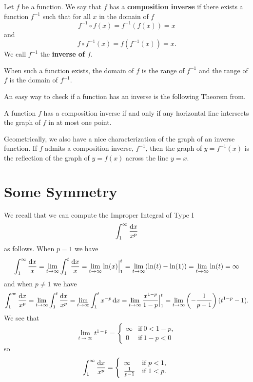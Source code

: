 \documentclass[reqno, 12pt]{amsart}
\begin{document}
  \begin{definition}
    Let \(f\) be a function.
    We say that \(f\) has a \textbf{composition inverse} if there exists a function \(f^{-1}\) such that for all \(x\) in the domain of \(f\)
    \[f^{-1} \circ f (x) = f^{-1}\left(f(x)\right) = x\]
    and
    \[f \circ f^{-1} (x) = f\left(f^{-1}(x)\right) = x.\]
    We call \(f^{-1}\) the \textbf{inverse of \(f\)}.

    When such a function exists, the domain of \(f\) is the range of \(f^{-1}\) and the range of \(f\) is the domain of \(f^{-1}\).
  \end{definition}

  An easy way to check if a function has an inverse is the following Theorem from.

  \begin{theorem}
    A function \(f\) has a composition inverse if and only if any horizontal line intersects the graph of \(f\) in at most one point.
  \end{theorem}

  Geometrically, we also have a nice characterization of the graph of an inverse function.
  If \(f\) admits a composition inverse, \(f^{-1}\), then the graph of \(y = f^{-1}(x)\) is the reflection of the graph of \(y = f(x)\) across the line \(y = x\).

  \section{Some Symmetry}
  We recall that we can compute the Improper Integral of Type I
\[\int_1^\infty \frac{\dif x}{x^p}\]
as follows.
When \(p = 1\) we have
\[\int_1^\infty \frac{\dif x}{x} = \lim_{t \to \infty}\int_1^t \frac{\dif x}{x} = \lim_{t \to \infty} \ln(x)\Big|_1^t = \lim_{t \to \infty}(\ln(t) - \ln(1)) = \lim_{t \to \infty} \ln(t) = \infty\]
and when \(p \neq 1\) we have
\[\int_1^\infty \frac{\dif x}{x^p} = \lim_{t \to \infty} \int_1^t \frac{\dif x}{x^p} = \lim_{t \to \infty} \int_1^t x^{-p}\dif x = \lim_{t \to \infty} \frac{x^{1 - p}}{1 - p}\Big|_1^t = \lim_{t \to \infty} \left(-\frac{1}{p - 1}\right) (t^{1 - p} - 1).\]
We see that
\[\lim_{t \to \infty} t^{1 - p} = \left\{ \begin{array}{ll}\infty & \text{if}\ 0 < 1 - p, \\ 0 & \text{if}\ 1 - p < 0\end{array}\right.\]
  so
  \[\int_1^\infty \frac{\dif x}{x^p} = \left\{ \begin{array}{ll}\infty & \text{if}\ p < 1,\\ \frac{1}{p - 1} & \text{if}\ 1 < p.\end{array}\right.\]
  
\end{document}
